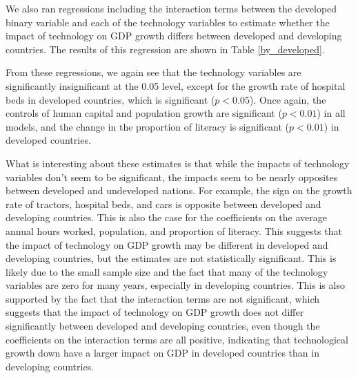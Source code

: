 \documentclass[11pt]{texMemo}
\begin{document}
We also ran regressions including the interaction terms between the developed binary variable and each of the technology variables to estimate whether the impact of technology on GDP growth differs between developed and developing countries.
The results of this regression are shown in Table \ref{by_developed}.



From these regressions, we again see that the technology variables are significantly insignificant at the 0.05 level, except for the growth rate of hospital beds in developed countries, which is significant ($p < 0.05$).
Once again, the controls of human capital and population growth are significant ($p < 0.01$) in all models, and the change in the proportion of literacy is significant ($p < 0.01$) in developed countries.

What is interesting about these estimates is that while the impacts of technology variables don't seem to be significant, the impacts seem to be nearly opposites between developed and undeveloped nations.
For example, the sign on the growth rate of tractors, hospital beds, and cars is opposite between developed and developing countries.
This is also the case for the coefficients on the average annual hours worked, population, and proportion of literacy.
This suggests that the impact of technology on GDP growth may be different in developed and developing countries, but the estimates are not statistically significant.
This is likely due to the small sample size and the fact that many of the technology variables are zero for many years, especially in developing countries.
This is also supported by the fact that the interaction terms are not significant, which suggests that the impact of technology on GDP growth does not differ significantly between developed and developing countries, even though the coefficients on the interaction terms are all positive, indicating that technological growth down have a larger impact on GDP in developed countries than in developing countries.
\end{document}
